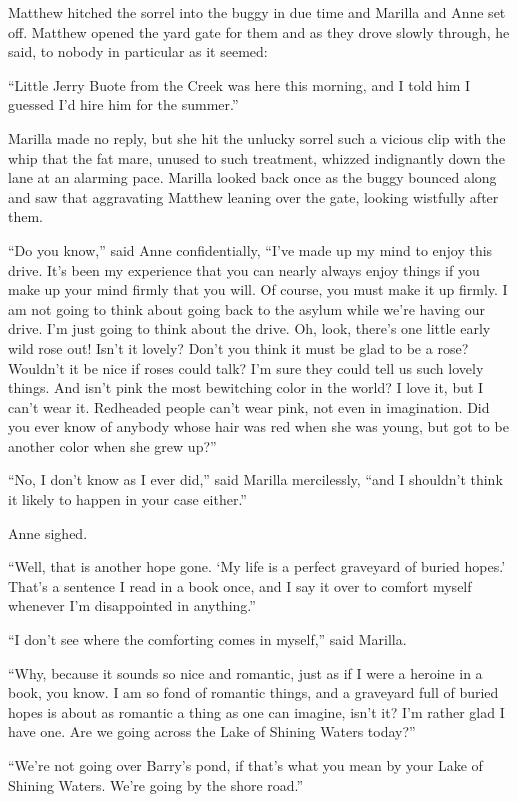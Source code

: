 \documentclass[a4paper]{article}
\begin{document}
Matthew hitched the sorrel into the buggy in due time and Marilla and Anne set off. Matthew opened the yard gate for them and as they drove slowly through, he said, to nobody in particular as it seemed:

``Little Jerry Buote from the Creek was here this morning, and I told him I guessed I'd hire him for the summer.''

Marilla made no reply, but she hit the unlucky sorrel such a vicious clip with the whip that the fat mare, unused to such treatment, whizzed indignantly down the lane at an alarming pace. Marilla looked back once as the buggy bounced along and saw that aggravating Matthew leaning over the gate, looking wistfully after them.

``Do you know,'' said Anne confidentially, ``I've made up my mind to enjoy this drive. It's been my experience that you can nearly always enjoy things if you make up your mind firmly that you will. Of course, you must make it up firmly. I am not going to think about going back to the asylum while we're having our drive. I'm just going to think about the drive. Oh, look, there's one little early wild rose out! Isn't it lovely? Don't you think it must be glad to be a rose? Wouldn't it be nice if roses could talk? I'm sure they could tell us such lovely things. And isn't pink the most bewitching color in the world? I love it, but I can't wear it. Redheaded people can't wear pink, not even in imagination. Did you ever know of anybody whose hair was red when she was young, but got to be another color when she grew up?''

``No, I don't know as I ever did,'' said Marilla mercilessly, ``and I shouldn't think it likely to happen in your case either.''

Anne sighed.

``Well, that is another hope gone. `My life is a perfect graveyard of buried hopes.' That's a sentence I read in a book once, and I say it over to comfort myself whenever I'm disappointed in anything.''

``I don't see where the comforting comes in myself,'' said Marilla.

``Why, because it sounds so nice and romantic, just as if I were a heroine in a book, you know. I am so fond of romantic things, and a graveyard full of buried hopes is about as romantic a thing as one can imagine, isn't it? I'm rather glad I have one. Are we going across the Lake of Shining Waters today?''

``We're not going over Barry's pond, if that's what you mean by your Lake of Shining Waters. We're going by the shore road.''
\end{document}
